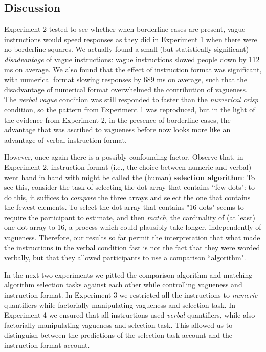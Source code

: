 \documentclass[%
man,		%
floatsintext,%
apacite%
]{apa6}
\begin{document}
\subsection{Discussion} %

Experiment 2 tested to see whether when borderline cases are present, vague instructions would speed responses as they did in Experiment 1 when there were no borderline squares. 
We actually found a small (but statistically significant) \emph{disadvantage} of vague instructions: vague instructions slowed people down by 112 ms on average. We also found that the effect of instruction format was significant, with numerical format slowing responses by 689 ms on average, such that the disadvantage of numerical format overwhelmed the contribution of vagueness. The \emph{verbal vague} condition was still responded to faster than the \emph{numerical crisp} condition, so the pattern from Experiment 1 was reproduced, but in the light of the evidence from Experiment 2, in the presence of borderline cases, the advantage that was ascribed to vagueness before now looks more like an advantage of verbal instruction format.

However, once again there is a possibly confounding factor. Observe that, in Experiment 2, instruction format (i.e., the choice between numeric and verbal) went hand in hand with might be called the (human) {\bf selection algorithm}: To see this, consider the task of selecting the dot array that contains ``few dots": to do this, it suffices to {\em compare} the three arrays and select the one that contains the fewest elements.  To select the dot array that contains "16 dots" seems to require the participant to estimate, and then {\em match}, the cardinality of (at least) one dot array to 16, a process which could plausibly take longer, independently of vagueness. Therefore, our results so far permit the interpretation that what made the instructions in the verbal condition fast is not the fact that they were worded verbally, but that they allowed participants to use a comparison ``algorithm".%

In the next two experiments we pitted the comparison algorithm and matching algorithm selection tasks against each other while controlling vagueness and instruction format. In Experiment 3 we restricted all the instructions to \emph{numeric} quantifiers while factorially manipulating vagueness and selection task. In Experiment 4 we ensured that all instructions used \emph{verbal} quantifiers, while also factorially manipulating vagueness and selection task. This allowed us to distinguish between the predictions of the selection task account and the instruction format account. 
\end{document}
